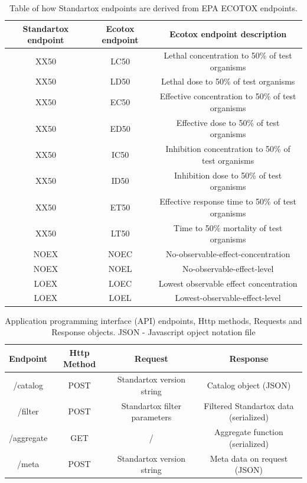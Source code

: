 \documentclass[journal,datadescriptor,accept,moreauthors,pdftex]{Definitions/mdpi}
\begin{document}
\begin{table}[H]
    \caption{Table of how Standartox endpoints are derived from EPA ECOTOX endpoints.}
    \label{tab:endpoints-conflate}
    \centering
\begin{tabular}{ccc}
    \toprule
    \textbf{Standartox endpoint} & \textbf{Ecotox endpoint} & \textbf{Ecotox endpoint description} \\
    \midrule
    XX50 & LC50 & Lethal concentration to 50\% of test organisms \\
    XX50 & LD50 & Lethal dose to 50\% of test organisms \\
    XX50 & EC50 & Effective concentration to 50\% of test organisms \\
    XX50 & ED50 & Effective dose to 50\% of test organisms \\
    XX50 & IC50 & Inhibition concentration to 50\% of test organisms \\
    XX50 & ID50 & Inhibition dose to 50\% of test organisms \\
    XX50 & ET50 & Effective response time to 50\% of test organisms \\
    XX50 & LT50 & Time to 50\% mortality of test organisms \\
    NOEX & NOEC & No-observable-effect-concentration \\
    NOEX & NOEL & No-observable-effect-level \\
    LOEX & LOEC & Lowest observable effect concentration\\
    LOEX & LOEL & Lowest-observable-effect-level \\
    \bottomrule
\end{tabular}
\end{table}

\begin{table}[H]
    \caption{Application programming interface (API) endpoints, Http methods, Requests and Response objects. JSON - Javascript opject notation file}
    \label{tab:api-endpoints}
    \centering
\begin{tabular}{cccc}
    \toprule
    \textbf{Endpoint} & \textbf{Http Method} & \textbf{Request} & \textbf{Response} \\
    \midrule
    /catalog & POST & Standartox version string & Catalog object (JSON) \\
    /filter & POST & Standartox filter parameters & Filtered Standartox data (serialized) \\
    /aggregate & GET & / & Aggregate function (serialized) \\
    /meta & POST & Standartox version string & Meta data on request (JSON) \\
    \bottomrule
\end{tabular}
\end{table}
\end{document}
